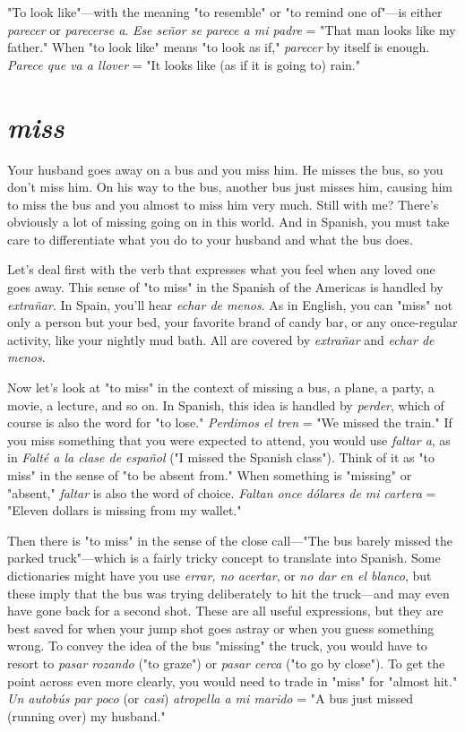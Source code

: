 "To look like"---with the meaning "to resemble" or "to remind one of"---is either \emph{parecer} or \emph{parecerse a}. \emph{Ese señor se parece a
mi padre} = "That man looks like my father." When "to look like"
means "to look as if," \emph{parecer} by itself is enough. \emph{Parece que va a
llover} = "It looks like (as if it is going to) rain."

\section{\emph{miss}}

Your husband goes away on a bus and you miss him. He
misses the bus, so you don't miss him. On his way to the bus, another
bus just misses him, causing him to miss the bus and you almost to
miss him very much. Still with me? There's obviously a lot of missing
going on in this world. And in Spanish, you must take care to differentiate what you do to your husband and what the bus does.

Let's deal first with the verb that expresses what you feel
when any loved one goes away. This sense of "to miss" in the Spanish
of the Americas is handled by \emph{extrañar}. In Spain, you'll hear \emph{echar de
menos}. As in English, you can "miss" not only a person but your bed,
your favorite brand of candy bar, or any once-regular activity, like your
nightly mud bath. All are covered by \emph{extrañar} and \emph{echar de menos}.

Now let's look at "to miss" in the context of missing a bus,
a plane, a party, a movie, a lecture, and so on. In Spanish, this idea is
handled by \emph{perder}, which of course is also the word for "to lose." \emph{Perdimos el tren} = "We missed the train." If you miss something that
you were expected to attend, you would use \emph{faltar a}, as in \emph{Falté a la
clase de español} ("I missed the Spanish class"). Think of it as "to
miss" in the sense of "to be absent from." When something is "missing" or "absent," \emph{faltar} is also the word of choice. \emph{Faltan once dólares
de mi cartera} = "Eleven dollars is missing from my wallet."

Then there is "to miss" in the sense of the close call---"The
bus barely missed the parked truck"---which is a fairly tricky concept
to translate into Spanish. Some dictionaries might have you use \emph{errar,
no acertar}, or \emph{no dar en el blanco}, but these imply that the bus was
trying deliberately to hit the truck---and may even have gone back for
a second shot. These are all useful expressions, but they are best saved
for when your jump shot goes astray or when you guess something
wrong. To convey the idea of the bus "missing" the truck, you would
have to resort to \emph{pasar rozando} ("to graze") or \emph{pasar cerca} ("to go by
close"). To get the point across even more clearly, you would need to
trade in "miss" for "almost hit." \emph{Un autobús par poco} (or \emph{casi}) \emph{atropella a mi marido} = "A bus just missed (running over) my husband."

